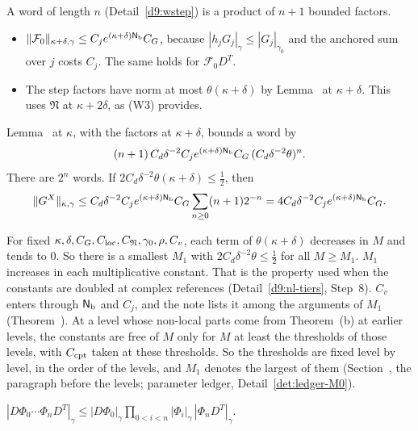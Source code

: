 \begin{detail}\label{d9:wi-a}
\begin{step}
A word of length $n$ (Detail~\ref{d9:wstep}) is a product of $n+1$ bounded factors.
\begin{itemize}
\item $\|\mathcal F_0\|_{\kappa+\delta,\gamma}\le C_je^{(\kappa+\delta)\mathsf N_{\rm b}}C_G$, because $|h_jG_j|_\gamma\le|G_j|_{\gamma_0}$ and the anchored sum over $j$ costs $C_j$. The same holds for $\mathcal F_0D^T$.
\item The step factors have norm at most $\theta(\kappa+\delta)$ by Lemma~ at $\kappa+\delta$. This uses $\mathfrak N$ at $\kappa+2\delta$, as (W3) provides.
\end{itemize}
Lemma~ at $\kappa$, with the factors at $\kappa+\delta$, bounds a word by
\[
(n+1)\,C_d\delta^{-2}C_je^{(\kappa+\delta)\mathsf N_{\rm b}}C_G\,(C_d\delta^{-2}\theta)^n .
\]
There are $2^n$ words. If $2C_d\delta^{-2}\theta(\kappa+\delta)\le\frac12$, then
\[
\|G^X\|_{\kappa,\gamma}\le C_d\delta^{-2}C_je^{(\kappa+\delta)\mathsf N_{\rm b}}C_G\sum_{n\ge0}(n+1)2^{-n}=4C_d\delta^{-2}C_je^{(\kappa+\delta)\mathsf N_{\rm b}}C_G .
\]
\end{step}
\begin{step}[$M_1$]
For fixed $\kappa,\delta,C_G,C_{\rm loc},C_{\mathfrak N},\gamma_0,\rho,C_v$, each term of $\theta(\kappa+\delta)$ decreases in $M$ and tends to $0$. So there is a smallest $M_1$ with $2C_d\delta^{-2}\theta\le\frac12$ for all $M\ge M_1$. $M_1$ increases in each multiplicative constant. That is the property used when the constants are doubled at complex references (Detail~\ref{d9:nl-tiers}, Step~8). $C_v$ enters through $\mathsf N_{\rm b}$ and $C_j$, and the note lists it among the arguments of $M_1$ (Theorem~). At a level whose non-local parts come from Theorem~(b) at earlier levels, the constants are free of $M$ only for $M$ at least the thresholds of those levels, with $C_{\rm cpt}$ taken at these thresholds. So the thresholds are fixed level by level, in the order of the levels, and $M_1$ denotes the largest of them (Section~, the paragraph before the levels; parameter ledger, Detail~\ref{det:ledger-M0}).
\end{step}
\begin{step}[Derivatives]
$|D\Phi_0\cdots\Phi_nD^T|_\gamma\le|D\Phi_0|_\gamma\prod_{0<i<n}|\Phi_i|_\gamma\,|\Phi_nD^T|_\gamma$.

\end{step}
\end{detail}
